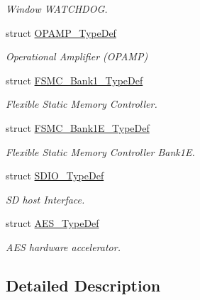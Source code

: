 \begin{DoxyCompactItemize}
\begin{DoxyCompactList}\small\item\em Window W\-A\-T\-C\-H\-D\-O\-G. \end{DoxyCompactList}\item 
struct \hyperlink{struct_o_p_a_m_p___type_def}{O\-P\-A\-M\-P\-\_\-\-Type\-Def}
\begin{DoxyCompactList}\small\item\em Operational Amplifier (O\-P\-A\-M\-P) \end{DoxyCompactList}\item 
struct \hyperlink{struct_f_s_m_c___bank1___type_def}{F\-S\-M\-C\-\_\-\-Bank1\-\_\-\-Type\-Def}
\begin{DoxyCompactList}\small\item\em Flexible Static Memory Controller. \end{DoxyCompactList}\item 
struct \hyperlink{struct_f_s_m_c___bank1_e___type_def}{F\-S\-M\-C\-\_\-\-Bank1\-E\-\_\-\-Type\-Def}
\begin{DoxyCompactList}\small\item\em Flexible Static Memory Controller Bank1\-E. \end{DoxyCompactList}\item 
struct \hyperlink{struct_s_d_i_o___type_def}{S\-D\-I\-O\-\_\-\-Type\-Def}
\begin{DoxyCompactList}\small\item\em S\-D host Interface. \end{DoxyCompactList}\item 
struct \hyperlink{struct_a_e_s___type_def}{A\-E\-S\-\_\-\-Type\-Def}
\begin{DoxyCompactList}\small\item\em A\-E\-S hardware accelerator. \end{DoxyCompactList}\end{DoxyCompactItemize}


\subsection{Detailed Description}
